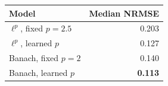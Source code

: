 \begin{tabular}{lr}
\toprule
Model & Median NRMSE \\
\midrule
$\ell^p$, fixed $p=2.5$ & 0.203 \\
$\ell^p$, learned $p$ & 0.127 \\
Banach, fixed $p=2$ & 0.140 \\
Banach, learned $p$ & \textbf{0.113} \\
\bottomrule
\end{tabular}
